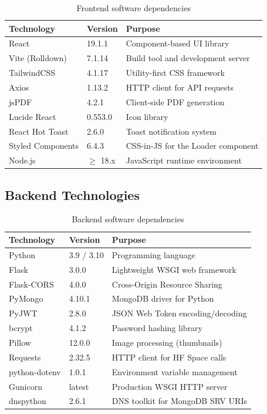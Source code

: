 \documentclass[12pt, a4paper, oneside]{report}
\begin{document}
\begin{table}[H]
\centering
\caption{Frontend software dependencies}
\label{tab:frontend_deps}
\begin{tabular}{llp{7cm}}
\toprule
\textbf{Technology} & \textbf{Version} & \textbf{Purpose} \\
\midrule
React & 19.1.1 & Component-based UI library \\
Vite (Rolldown) & 7.1.14 & Build tool and development server \\
TailwindCSS & 4.1.17 & Utility-first CSS framework \\
Axios & 1.13.2 & HTTP client for API requests \\
jsPDF & 4.2.1 & Client-side PDF generation \\
Lucide React & 0.553.0 & Icon library \\
React Hot Toast & 2.6.0 & Toast notification system \\
Styled Components & 6.4.3 & CSS-in-JS for the Loader component \\
Node.js & $\geq$ 18.x & JavaScript runtime environment \\
\bottomrule
\end{tabular}
\end{table}

\subsection{Backend Technologies}

\begin{table}[H]
\centering
\caption{Backend software dependencies}
\label{tab:backend_deps}
\begin{tabular}{llp{7cm}}
\toprule
\textbf{Technology} & \textbf{Version} & \textbf{Purpose} \\
\midrule
Python & 3.9 / 3.10 & Programming language \\
Flask & 3.0.0 & Lightweight WSGI web framework \\
Flask-CORS & 4.0.0 & Cross-Origin Resource Sharing \\
PyMongo & 4.10.1 & MongoDB driver for Python \\
PyJWT & 2.8.0 & JSON Web Token encoding/decoding \\
bcrypt & 4.1.2 & Password hashing library \\
Pillow & 12.0.0 & Image processing (thumbnails) \\
Requests & 2.32.5 & HTTP client for HF Space calls \\
python-dotenv & 1.0.1 & Environment variable management \\
Gunicorn & latest & Production WSGI HTTP server \\
dnspython & 2.6.1 & DNS toolkit for MongoDB SRV URIs \\
\bottomrule
\end{tabular}
\end{table}
\end{document}
